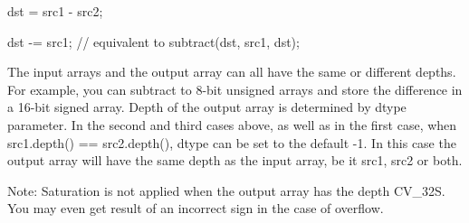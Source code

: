 {\ttfamily }

{\ttfamily }

{\ttfamily dst = src1 -\/ src2;}

{\ttfamily }

{\ttfamily }

{\ttfamily dst -\/= src1; // equivalent to subtract(dst, src1, dst);}

{\ttfamily }

{\ttfamily }

{\ttfamily The input arrays and the output array can all have the same or different depths. For example, you can subtract to 8-\/bit unsigned arrays and store the difference in a 16-\/bit signed array. Depth of the output array is determined by {\ttfamily dtype} parameter. In the second and third cases above, as well as in the first case, when {\ttfamily src1.\+depth() == src2.\+depth()}, {\ttfamily dtype} can be set to the default {\ttfamily -\/1}. In this case the output array will have the same depth as the input array, be it {\ttfamily src1}, {\ttfamily src2} or both. }

Note\+: Saturation is not applied when the output array has the depth {\ttfamily C\+V\+\_\+32S}. You may even get result of an incorrect sign in the case of overflow.


